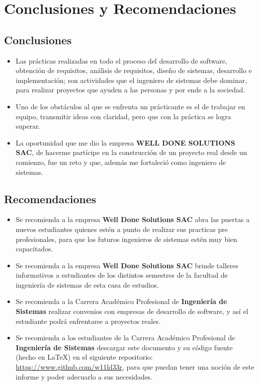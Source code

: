 \chapter{Conclusiones y Recomendaciones}
	
	\section{Conclusiones}
		\begin{itemize}
		  \item {Las prácticas realizadas en todo el proceso del desarrollo de software,
		obtención de requisitos, análisis de requisitos, diseño de sistemas,
		desarrollo e implementación; son actividades que el ingeniero de sistemas
		debe dominar, para realizar proyectos que ayuden a las personas y por ende a
		la sociedad.}

			\item {Uno de los obstáculos al que se enfrenta un prácticante es el de
			trabajar en equipo, transmitir ideas con claridad, pero que con la práctica
			se logra superar.}
			
			\item {La oportunidad que me dio la empresa {\bf WELL DONE SOLUTIONS SAC}, de
			hacerme partícipe en la construcción de un proyecto real desde un comienzo,
			fue un reto y que, además me fortaleció como ingeniero de sistemas. }
		\end{itemize}
		
	\section{Recomendaciones}
		\begin{itemize}
		  \item {Se recomienda a la empresa {\bf Well Done Solutions SAC} abra las
		  puertas a nuevos estudiantes quienes estén a punto de realizar sus
		  practicas pre profesionales, para que los futuros ingenieros de sistemas
		  estén muy bien capacitados.}
		  
		  \item {Se recomienda a la empresa {\bf Well Done Solutions SAC} brinde
		  talleres informativos a estudiantes de los distintos semestres de la
		  facultad de ingeniería de sistemas de esta casa de estudios.}
		  
		  \item {Se recomienda a la Carrera Académico Profesional de {\bf Ingeniería
		  de Sistemas} realizar convenios con empresas de  desarrollo de software, y así el estudiante
		  podrá enfrentarse a proyectos reales.}
		  
		  \item {Se recomienda a los estudiantes de la Carrera Académico Profesional de {\bf Ingeniería
		  de Sistemas} descargar este documento y su código fuente (hecho en {\LaTeX})
		  en el siguiente repositorio:
		  \href{https://www.github.com/w11ld33r}{https://www.github.com/w11ld33r}, para que puedan tener una noción de este informe y poder adecuarlo a sus necesidades.}
		  
		\end{itemize}